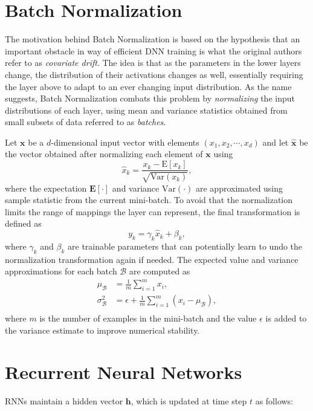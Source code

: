 \documentclass{article}
\begin{document}
\section{Batch Normalization}

The motivation behind Batch Normalization is based on the hypothesis that an
important obstacle in way of efficient DNN training is what the original
authors refer to as \emph{covariate drift}. The idea is that as the parameters
in the lower layers change, the distribution of their activations changes as
well, essentially requiring the layer above to adapt to an ever changing input
distribution. As the name suggests, Batch Normalization combats this problem by
\emph{normalizing} the input distributions of each layer, using mean and
variance statistics obtained from small subsets of data referred to as
\emph{batches}.

Let $\mathbf{x}$ be a $d$-dimensional input vector with elements $(x_1, x_2, \cdots, x_d)$ and let $\mathbf{\hat{x}}$ be the vector obtained after normalizing each element of $\mathbf{x}$ using
\begin{equation}
\hat{x}_k = \frac{x_k - \mathrm{E}[x_k]}{\sqrt{\text{Var}(x_k)}},
\end{equation}
where the expectation $\mathbf{E}[\cdot]$ and variance $\text{Var}(\cdot)$ are
approximated using sample statistic from the current mini-batch.
To avoid that the normalization limits the range of mappings the layer can represent, the final transformation is defined as
\begin{equation}
y_k = \gamma_k \hat{x}_k + \beta_k,
\end{equation}
where $\gamma_k$ and $\beta_k$ are trainable parameters that can potentially
learn to undo the normalization transformation again if needed.
The expected value and variance approximations for each batch $\mathcal{B}$ are computed as
\begin{align}
\mu_{\mathcal{B}} &= \frac{1}{m}\sum_{i=1}^{m} x_i,\\
\sigma^2_{\mathcal{B}} &= \epsilon + \frac{1}{m}\sum_{i=1}^{m} (x_i - \mu_{\mathcal{B}}),\\
\end{align}
where $m$ is the number of examples in the mini-batch and the value $\epsilon$
is added to the variance estimate to improve numerical stability.

\section{Recurrent Neural Networks}
RNNs maintain a hidden vector $\boldsymbol h$, which is updated at time step $t$ as follows:
 
\end{document}
